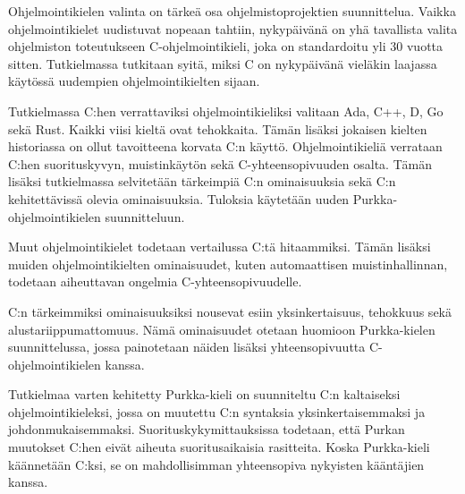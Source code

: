 Ohjelmointikielen valinta on tärkeä osa ohjelmistoprojektien suunnittelua.
Vaikka ohjelmointikielet uudistuvat nopeaan tahtiin, nykypäivänä on yhä
tavallista valita ohjelmiston toteutukseen C-ohjelmointikieli, joka on
standardoitu yli 30 vuotta sitten. Tutkielmassa tutkitaan syitä, miksi C on
nykypäivänä vieläkin laajassa käytössä uudempien ohjelmointikielten sijaan.

Tutkielmassa C:hen verrattaviksi ohjelmointikieliksi valitaan Ada, C++, D,
Go sekä Rust. Kaikki viisi kieltä ovat tehokkaita. Tämän lisäksi jokaisen
kielten historiassa on ollut tavoitteena korvata C:n käyttö.
Ohjelmointikieliä verrataan C:hen suorituskyvyn, muistinkäytön sekä
C-yhteensopivuuden osalta. Tämän lisäksi tutkielmassa selvitetään
tärkeimpiä C:n ominaisuuksia sekä C:n kehitettävissä olevia ominaisuuksia.
Tuloksia käytetään uuden Purkka-ohjelmointikielen suunnitteluun.

Muut ohjelmointikielet todetaan vertailussa C:tä hitaammiksi. Tämän lisäksi
muiden ohjelmointikielten ominaisuudet, kuten automaattisen
muistinhallinnan, todetaan aiheuttavan ongelmia C-yhteensopivuudelle.

C:n tärkeimmiksi ominaisuuksiksi nousevat esiin yksinkertaisuus, tehokkuus
sekä alustariippumattomuus. Nämä ominaisuudet otetaan huomioon
Purkka-kielen suunnittelussa, jossa painotetaan näiden lisäksi
yhteensopivuutta C-ohjelmointikielen kanssa.

Tutkielmaa varten kehitetty Purkka-kieli on suunniteltu C:n kaltaiseksi
ohjelmointikieleksi, jossa on muutettu C:n syntaksia yksinkertaisemmaksi ja
johdonmukaisemmaksi. Suorituskykymittauksissa todetaan, että Purkan muutokset
C:hen eivät aiheuta suoritusaikaisia rasitteita. Koska Purkka-kieli käännetään
C:ksi, se on mahdollisimman yhteensopiva nykyisten kääntäjien kanssa.
